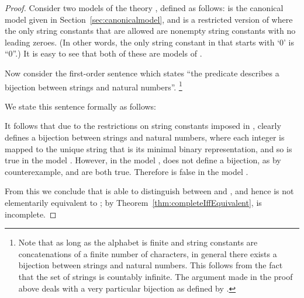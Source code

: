 \begin{proof}
  Consider two models  of the theory , defined as
  follows:  is the canonical model given in
  Section~\ref{sec:canonicalmodel}, and  is a restricted version of
   where the only string constants that are allowed
  are nonempty string constants with no leading zeroes. (In other
  words, the only string constant in  that starts with `0' is
  ``0''.) It is easy to see that both of these are models of
  .

  Now consider the first-order sentence  which states ``the
   predicate describes a bijection between strings and natural
  numbers''.
\footnote{Note that as long as the alphabet  is finite and
  string constants are concatenations of a finite number of
  characters, in general there exists a bijection between strings and
  natural numbers. This follows from the fact that the set 
  of strings is countably infinite. The argument made in the proof
  above deals with a very particular bijection as defined by
  .}

We state this sentence  formally as follows:



  It follows that due to the restrictions on string constants imposed
  in ,  clearly defines a bijection between strings and
  natural numbers, where each integer is mapped to the unique string
  that is its minimal binary representation, and so  is true in the
  model .  However, in the model ,  does not define a
  bijection, as by counterexample,  and  are both true.  Therefore  is false in the model .
  
  From this we conclude that  is able to distinguish between 
  and , and hence  is not elementarily equivalent to ; by
  Theorem~\ref{thm:completeIffEquivalent},  is
  incomplete.
\end{proof}

